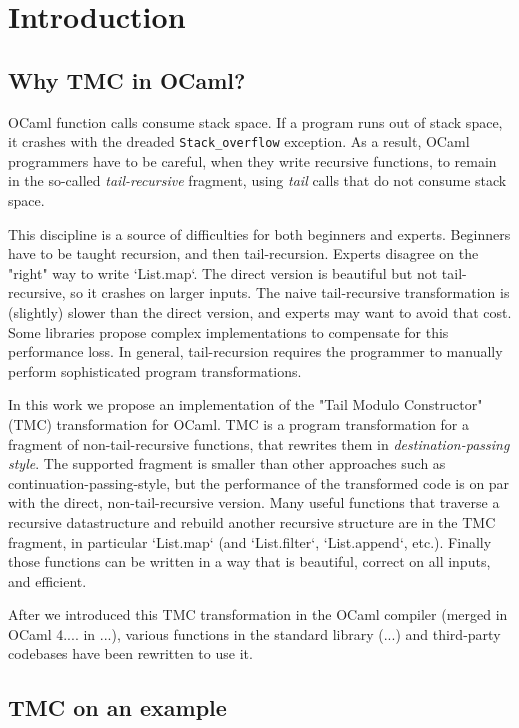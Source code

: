\section{Introduction}

\subsection{Why TMC in OCaml?}

OCaml function calls consume stack space. If a program runs out of stack space, it crashes with the dreaded \texttt{Stack\_overflow} exception. As a result, OCaml programmers have to be careful, when they write recursive functions, to remain in the so-called \emph{tail-recursive} fragment, using \emph{tail} calls that do not consume stack space.

This discipline is a source of difficulties for both beginners and experts. Beginners have to be taught recursion, and then tail-recursion. Experts disagree on the "right" way to write `List.map`. The direct version is beautiful but not tail-recursive, so it crashes on larger inputs. The naive tail-recursive transformation is (slightly) slower than the direct version, and experts may want to avoid that cost. Some libraries propose complex implementations to compensate for this performance loss. In general, tail-recursion requires the programmer to manually perform sophisticated program transformations.

In this work we propose an implementation of the "Tail Modulo Constructor" (TMC) transformation for OCaml. TMC is a program transformation for a fragment of non-tail-recursive functions, that rewrites them in \emph{destination-passing style}. The supported fragment is smaller than other approaches such as continuation-passing-style, but the performance of the transformed code is on par with the direct, non-tail-recursive version. Many useful functions that traverse a recursive datastructure and rebuild another recursive structure are in the TMC fragment, in particular `List.map` (and `List.filter`, `List.append`, etc.). Finally those functions can be written in a way that is beautiful, correct on all inputs, and efficient.

After we introduced this TMC transformation in the OCaml compiler (merged in OCaml 4.... in ...), various functions in the standard library (...) and third-party codebases have been rewritten to use it.

\subsection{TMC on an example}

